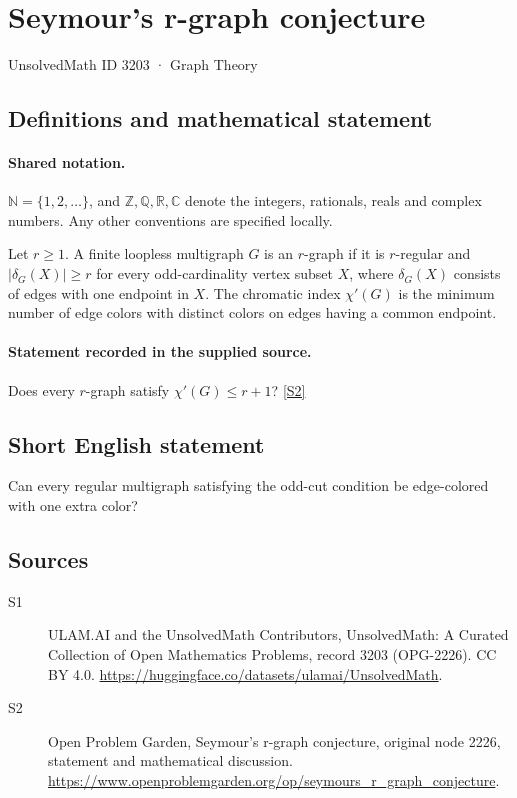 \documentclass[11pt]{article}
\newcommand{\sref}[2]{\hyperlink{source:#1:#2}{[S#2]}}
\begin{document}
\setcounter{section}{3202}
\section{Seymour's r-graph conjecture}\label{3203}
{\small\sffamily UnsolvedMath ID 3203 · Graph Theory}
\subsection{Definitions and mathematical statement}

\paragraph{Shared notation.}$\mathbb N=\{1,2,\ldots\}$, and $\mathbb Z,\mathbb Q,\mathbb R,\mathbb C$ denote the integers, rationals, reals and complex numbers. Any other conventions are specified locally.


Let $r\ge1$. A finite loopless multigraph $G$ is an $r$-graph if it is $r$-regular and $|\delta_G(X)|\ge r$ for every odd-cardinality vertex subset $X$, where $\delta_G(X)$ consists of edges with one endpoint in $X$. The chromatic index $\chi'(G)$ is the minimum number of edge colors with distinct colors on edges having a common endpoint.
\paragraph{Statement recorded in the supplied source.}
Does every $r$-graph satisfy $\chi'(G)\le r+1$? \sref{3203}{2}
\subsection{Short English statement}
Can every regular multigraph satisfying the odd-cut condition be edge-colored with one extra color?
\subsection{Sources}
\begin{description}
\item[\hypertarget{source:3203:1}{S1}] ULAM.AI and the UnsolvedMath Contributors, UnsolvedMath: A Curated Collection of Open Mathematics Problems, record 3203 (OPG-2226). CC BY 4.0. \url{https://huggingface.co/datasets/ulamai/UnsolvedMath}.
\item[\hypertarget{source:3203:2}{S2}] Open Problem Garden, Seymour's r-graph conjecture, original node 2226, statement and mathematical discussion. \url{https://www.openproblemgarden.org/op/seymours_r_graph_conjecture}.
\end{description}
\label{end:3203}
\end{document}
